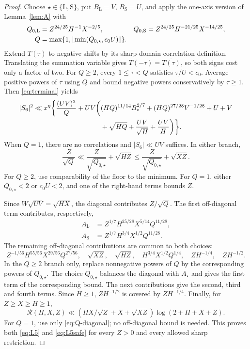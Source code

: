 \documentclass[11pt,a4paper]{article}
\numberwithin{equation}{section}
\theoremstyle{remark}
\begin{document}
\begin{proof}
Choose $\star\in\{\mathrm L,\mathrm S\}$, put
$B_{\mathrm L}=V$, $B_{\mathrm S}=U$, and apply the one-axis version of
Lemma~\ref{lem:A} with
\begin{align}
 Q_{0,\mathrm L}&=Z^{24/25}H^{-1}X^{-2/5},&
 Q_{0,\mathrm S}&=Z^{24/25}H^{-21/25}X^{-14/25},\notag\\
 Q&=\max\{1,\lfloor\min(Q_{0,\star},c_0U)\rfloor\}.
 \label{eq:Q-choice}
\end{align}
Extend $T(\tau)$ to negative shifts by its sharp-domain correlation
definition. Translating the summation variable gives
$T(-\tau)=\overline{T(\tau)}$, so both signs cost only a factor of two.
For $Q\ge2$, every $1\le\tau<Q$ satisfies $\tau/U<c_0$.
Average positive powers of $\tau$ using $Q$ and bound negative powers
conservatively by $\tau\ge1$. Then \eqref{eq:terminal} yields
\begin{align}
 |S_6|^2\ll x^\eta\biggl\{\frac{(UV)^2}{Q}
 +UV\biggl(& (HQ)^{11/14}B_\star^{2/7}
       +(HQ)^{27/28}V^{-1/28}+U+V\notag\\
       &+\sqrt{HQ}+\frac{UV}{\sqrt H}+\frac{UV}{H}
       \biggr)\biggr\}.\label{eq:S6-square}
\end{align}
When $Q=1$, there are no correlations and $|S_6|\ll UV$ suffices.
In either branch,
\begin{equation}\label{eq:Q-diagonal}
 \frac Z{\sqrt Q}\ll\frac Z{\sqrt{Q_{0,\star}}}+\sqrt{HZ}
 \le\frac Z{\sqrt{Q_{0,\star}}}+\sqrt{XZ}.
\end{equation}
For $Q\ge2$, use comparability of the floor to the minimum. For $Q=1$,
either $Q_{0,\star}<2$ or $c_0U<2$, and one of the right-hand terms
bounds $Z$.

Since $W\sqrt{UV}=\sqrt{HX}$, the diagonal contributes $Z/\sqrt Q$.
The first off-diagonal term contributes, respectively,
\begin{align*}
 A_{\mathrm L}&=Z^{1/7}H^{25/28}X^{5/14}Q^{11/28},\\
 A_{\mathrm S}&=Z^{1/7}H^{3/4}X^{1/2}Q^{11/28}.
\end{align*}
The remaining off-diagonal contributions are common to both choices:
\[
 Z^{-1/56}H^{55/56}X^{29/56}Q^{27/56},\quad
 \sqrt{XZ},\quad\sqrt{HZ},\quad
 H^{3/4}X^{1/2}Q^{1/4},\quad
 ZH^{-1/4},\quad ZH^{-1/2}.
\]
In the $Q\ge2$ branch only, replace nonnegative powers of $Q$ by
the corresponding powers of $Q_{0,\star}$. The choice
$Q_{0,\star}$ balances the diagonal with $A_\star$ and gives the first
term of the corresponding bound. The next contributions give the
second, third and fourth terms. Since $H\ge1$, $ZH^{-1/2}$ is covered
by $ZH^{-1/4}$. Finally, for $Z\ge X\ge H\ge1$,
\[
 \mathcal R(H,X,Z)\ll
 (HX/\sqrt Z+X+\sqrt{XZ})\log(2+H+X+Z).
\]
For $Q=1$, use only \eqref{eq:Q-diagonal}; no off-diagonal bound is
needed. This proves both \eqref{eq:L5} and \eqref{eq:L5safe} for every
$Z>0$ and every allowed sharp restriction.
\end{proof}
\end{document}
